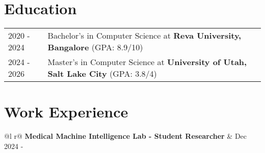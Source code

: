 \documentclass[a4paper, 11pt]{article}
\begin{document}
	\section{Education}
	\begin{tabularx}{\linewidth}{@{}l X@{}}	
		
		2020 - 2024 & Bachelor's in Computer Science at \textbf{Reva University, Bangalore} \hfill (GPA: 8.9/10) \\ 

        2024 - 2026 & Master's in Computer Science at \textbf{University of Utah, Salt Lake City} \hfill (GPA: 3.8/4) \\
		
	\end{tabularx}
	

	
	\section{Work Experience}


	\begin{tabularx}{\linewidth}{ @{}l r@{} }
		\textbf{Medical Machine Intelligence Lab - Student Researcher} & \hfill Dec 2024 -  \\[3.75pt]
	\end{tabularx}
\end{document}
